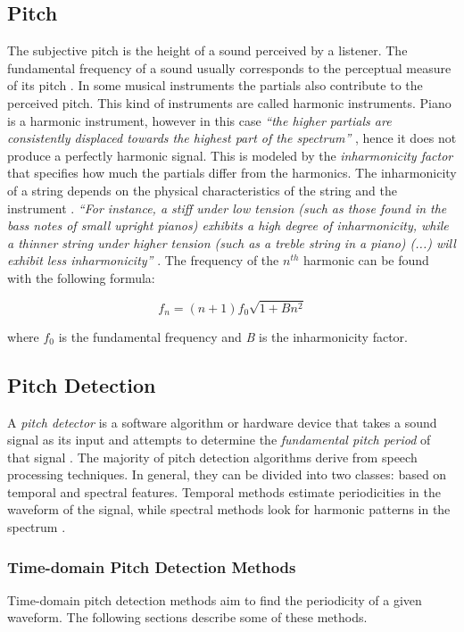 \documentclass[11pt]{article} %
\begin{document}
\subsection{Pitch}
The subjective pitch is the height of a sound perceived by a listener. The fundamental frequency of a sound usually corresponds to the perceptual measure of its pitch \citep*{Brossier2006}. In some musical instruments the partials also contribute to the perceived pitch. This kind of instruments are called harmonic instruments. Piano is a harmonic instrument, however in this case \textit{``the higher partials are consistently displaced towards the highest part of the spectrum''} \citep*{Brossier2006}, hence it does not produce a perfectly harmonic signal. This is modeled by the \textit{inharmonicity factor} that specifies how much the partials differ from the harmonics. The inharmonicity of a string depends on the physical characteristics of the string and the instrument \citep*{FletcherRossing}. \textit{``For instance, a stiff under low tension (such as those found in the bass notes of small upright pianos) exhibits a high degree of inharmonicity, while a thinner string under higher tension (such as a treble string in a piano) (...) will exhibit less inharmonicity''} \citep*{wiki:inharmonicity}. The frequency of the $n^{th}$ harmonic can be found with the following formula:

\[ f_n = (n+1) f_0 \sqrt{1 + Bn^2} \]

where \textit{$f_0$} is the fundamental frequency and \textit{B} is the inharmonicity factor.


\subsection{Pitch Detection}
A \textit{pitch detector} is a software algorithm or hardware device that takes a sound signal as its input and attempts to determine the \textit{fundamental pitch period} of that signal \citep*{Roads1996}. The majority of pitch detection algorithms derive from speech processing techniques. In general, they can be divided into two classes: based on temporal and spectral features. Temporal methods estimate periodicities in the waveform of the signal, while spectral methods look for harmonic patterns in the spectrum \citep*{Brossier2006}.

\subsubsection{Time-domain Pitch Detection Methods}
Time-domain pitch detection methods aim to find the periodicity of a given waveform. The following sections describe some of these methods.
\end{document}
